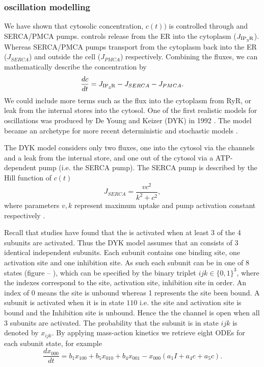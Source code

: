 \documentclass[../main.tex]{subfiles}
\begin{document}
\subsubsection{ oscillation modelling}
We have shown that cytosolic  concentration, $c(t))$ is controlled through  and SERCA/PMCA pumps.  controls  release from the ER into the cytoplasm ($J_{\ce{IP_3R}}$). Whereas SERCA/PMCA pumps transport  from the cytoplasm back into the ER ($J_{SERCA}$) and outside the cell ($J_{PMCA}$) respectively. Combining the fluxes, we can mathematically describe the  concentration by 
\begin{equation}
\frac{dc}{dt} =  J_{\ce{IP_3R}} - J_{SERCA} - J_{PMCA}.
\end{equation}
We could include more terms such as the flux into the cytoplasm from RyR, or leak from the internal stores into the cytosol. One of the first realistic models for  oscillations was produced by De Young and Keizer (DYK) in 1992 \cite{DeYoung_1992}. The model became an archetype for more recent deterministic \cite{Li_1994, Atri_1993, Tang_1996} and stochastic models \cite{Falcke_2000, Falcke_2003}.

The DYK model considers only two fluxes, one into the cytosol via the  channels and a leak from the internal store, and one out of the cytosol via a ATP-dependent pump (i.e. the SERCA pump). The SERCA pump is described by the Hill function of $c(t)$
\begin{equation}
J_{SERCA} = \frac{vc^2}{k^2 + c^2},
\end{equation}
where parameters $v,k$ represent maximum  uptake and pump activation constant respectively \cite{DeYoung_1992}.

Recall that studies have found that the  is activated when at least 3 of the 4 subunits are activated. Thus the DYK model assumes that an  consists of 3 identical independent subunits. Each subunit contains one  binding site, one  activation site and one  inhibition site. As such each subunit can be in one of 8 states (figure -- ), which can be specified by the binary triplet ${ijk} \in \{0,1 \}^3$, where the indexes correspond to the  site,  activation site,  inhibition site in order. An index of 0 means the site is unbound whereas 1 represents the site been bound. A subunit is activated when it is in state ${110}$ i.e. the  site and  activation site is bound and the  Inhibition site is unbound. Hence the the channel is open when all 3 subunits are activated. The probability that the subunit is in state $ijk$ is denoted by $x_{ijk}$.
By applying mass-action kinetics we retrieve eight ODEs for each subunit state, for example
\begin{equation}
\frac{d x_{000}}{dt} =b_1x_{100} + b_5x_{010} + b_4x_{001} -x_{000}\left(a_1I + a_4c  +a_5c \right). 
\end{equation} 
\end{document}
